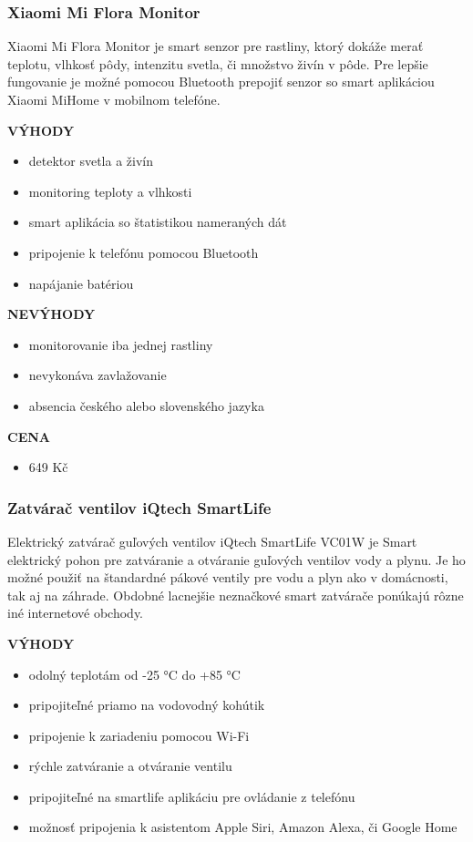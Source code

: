 \documentclass[twoside]{ctuthesis}
\theoremstyle{plain}
\theoremstyle{definition}
\theoremstyle{note}
\begin{document}
\subsubsection*{Xiaomi Mi Flora Monitor}
Xiaomi Mi Flora Monitor je smart senzor pre rastliny, ktorý dokáže merať teplotu, vlhkosť pôdy, intenzitu svetla, či množstvo živín v pôde. Pre lepšie fungovanie je možné pomocou Bluetooth prepojiť senzor so smart aplikáciou Xiaomi MiHome v mobilnom telefóne. \cite{xiaomimiflora}
\newline

\textbf{VÝHODY}
\begin{itemize}
\item detektor svetla a živín
\item monitoring teploty a vlhkosti 
\item smart aplikácia so štatistikou nameraných dát
\item pripojenie k telefónu pomocou Bluetooth
\item napájanie batériou
\end{itemize}

\textbf{NEVÝHODY}
\begin{itemize}
\item monitorovanie iba jednej rastliny
\item nevykonáva zavlažovanie
\item absencia českého alebo slovenského jazyka
\end{itemize}

\textbf{CENA}
\begin{itemize}
\item 649 Kč
\end{itemize}

\subsubsection*{Zatvárač ventilov iQtech SmartLife}
\label{sec:agora}
Elektrický zatvárač guľových ventilov iQtech SmartLife VC01W je Smart elektrický pohon pre zatváranie a otváranie guľových ventilov vody a plynu.
Je ho možné použiť na štandardné pákové ventily pre vodu a plyn ako v domácnosti, tak aj na záhrade. Obdobné lacnejšie neznačkové smart zatvárače ponúkajú rôzne iné internetové obchody. \cite{agora}
\newline

\textbf{VÝHODY}
\begin{itemize}
\item odolný teplotám od -25 °C do +85 °C
\item pripojiteľné priamo na vodovodný kohútik
\item pripojenie k zariadeniu pomocou Wi-Fi
\item rýchle zatváranie a otváranie ventilu
\item pripojiteľné na smartlife aplikáciu pre ovládanie z telefónu
\item možnosť pripojenia k asistentom Apple Siri, Amazon Alexa, či Google Home
\end{itemize}
\end{document}
